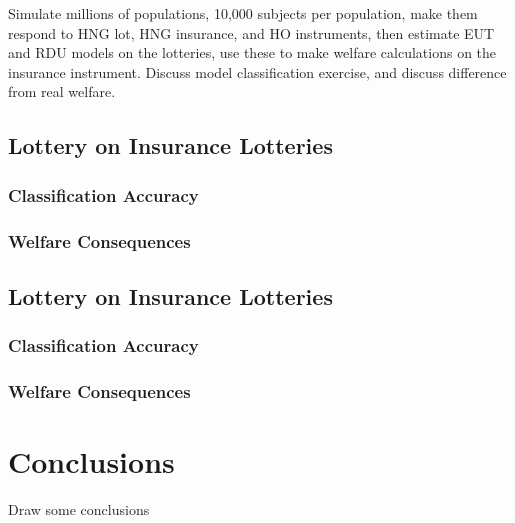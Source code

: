 \documentclass[../main.tex]{subfiles}
\begin{document}
	Simulate millions of populations, 10,000 subjects per population, make them respond to HNG lot, HNG insurance, and HO instruments, then estimate EUT and RDU models on the lotteries, use these to make welfare calculations on the insurance instrument.
	Discuss model classification exercise, and discuss difference from real welfare.

	\subsection{ \texorpdfstring{\textcite{Harrison2016}}{Harrison and Ng (2016)} Lottery on \texorpdfstring{\textcite{Harrison2016}}{Harrison and Ng (2016)} Insurance Lotteries   }
		\subsubsection{Classification Accuracy}
		\subsubsection{Welfare Consequences}
	\subsection{ \texorpdfstring{\textcite{Hey1994}}{Hey and Orme (1994)} Lottery on \texorpdfstring{\textcite{Harrison2016}}{Harrison and Ng (2016)} Insurance Lotteries   }
		\subsubsection{Classification Accuracy}
		\subsubsection{Welfare Consequences}
\section{Conclusions}
Draw some conclusions

\newpage
\printbibliography[segment=3, heading=subbibliography]
\end{document}
